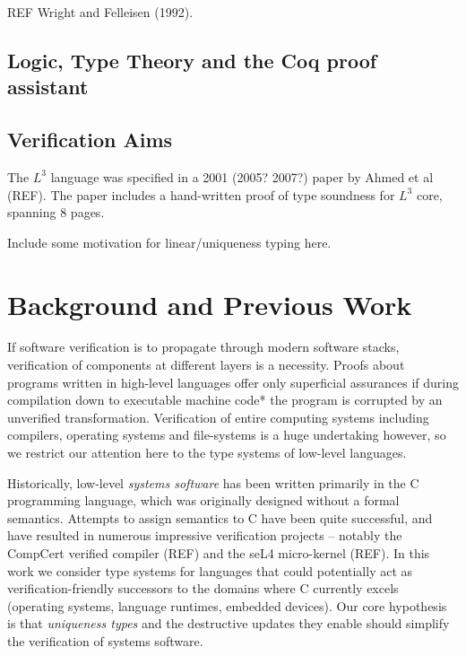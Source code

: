 \documentclass[]{unswthesis}
\begin{document}
REF Wright and Felleisen (1992).

\section{Logic, Type Theory and the Coq proof assistant}

\section{Verification Aims}

The $L^3$ language was specified in a 2001 (2005? 2007?) paper by Ahmed et al (REF). The paper includes a hand-written proof of type soundness for $L^3$ core, spanning 8 pages.

Include some motivation for linear/uniqueness typing here.

\chapter{Background and Previous Work}
\label{ch:intro}


If software verification is to propagate through modern software stacks, verification of components at different layers is a necessity. Proofs about programs written in high-level languages offer only superficial assurances if during compilation down to executable machine code* the program is corrupted by an unverified transformation. Verification of entire computing systems including compilers, operating systems and file-systems is a huge undertaking however, so we restrict our attention here to the type systems of low-level languages.

Historically, low-level \textit{systems software} has been written primarily in the C programming language, which was originally designed without a formal semantics. Attempts to assign semantics to C have been quite successful, and have resulted in numerous impressive verification projects -- notably the CompCert verified compiler (REF) and the seL4 micro-kernel (REF). In this work we consider type systems for languages that could potentially act as verification-friendly successors to the domains where C currently excels (operating systems, language runtimes, embedded devices). Our core hypothesis is that \textit{uniqueness types} and the destructive updates they enable should simplify the verification of systems software.
\end{document}
